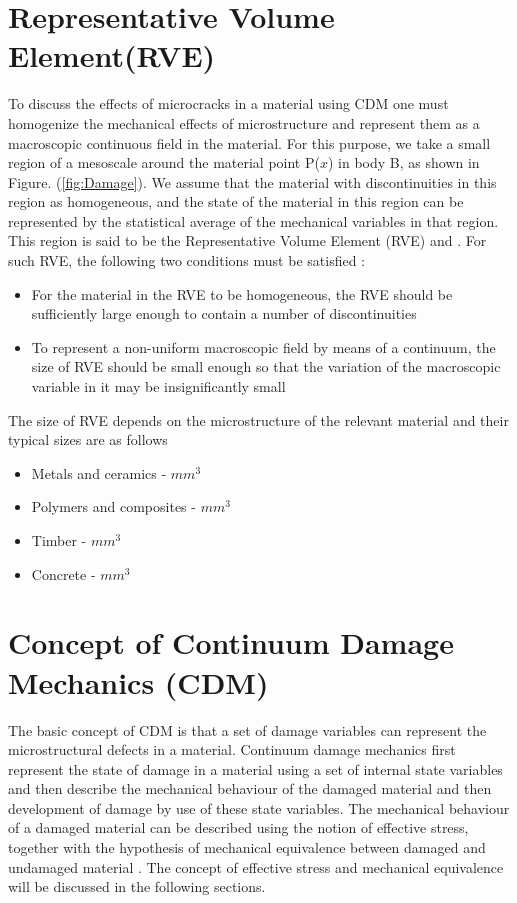 \documentclass[12pt,a4paper,twoside,openright]{report}
\begin{document}
\section{Representative Volume Element(RVE)}
\indent\indent\indent  To discuss the effects of microcracks in a material using CDM one must homogenize the mechanical effects of microstructure and represent them as a macroscopic continuous field in the material. For this purpose, we take a small region of a mesoscale around the material point P($x$) in body B, as shown in Figure. (\ref{fig:Damage}). We assume that the material with discontinuities in this region as homogeneous, and the state of the material in this region can be represented by the statistical average of the mechanical variables in that region. This region is said to be the Representative Volume Element (RVE) \citep{hill1963elastic} and \citep{hashin1983analysis}. For such RVE, the following two conditions must be satisfied \citep{murakami2012continuum}:
\begin{itemize}
\item  For the material in the RVE to be homogeneous, the RVE should be sufficiently large enough to contain a number of discontinuities
\item To represent a non-uniform macroscopic field by means of a continuum, the size of RVE should be small enough so that the variation of the macroscopic variable in it may be insignificantly small 
\end{itemize}
The size of RVE depends on the microstructure of the relevant material and their typical sizes are as follows \citep{lemaitre2012course}
\begin{itemize}
\item Metals and ceramics  \;    -    \;$mm^3$
\item Polymers and composites \;   -   \;$mm^3$
\item Timber\; - \;$mm^3$
\item Concrete \; - \;$mm^3$
\end{itemize}

\section{Concept of Continuum Damage Mechanics (CDM)}
\indent\indent\indent The basic concept of CDM is that a set of damage variables can represent the microstructural defects in a material. Continuum damage mechanics first represent the state of damage in a material using a set of internal state variables and then describe the mechanical behaviour of the damaged material and then development of damage by use of these state variables. The mechanical behaviour of a damaged material can be described using the notion of effective stress, together with the hypothesis of mechanical equivalence between damaged and undamaged material \citep{murakami2012continuum}. The concept of effective stress and mechanical equivalence will be discussed in the following sections.
\end{document}
